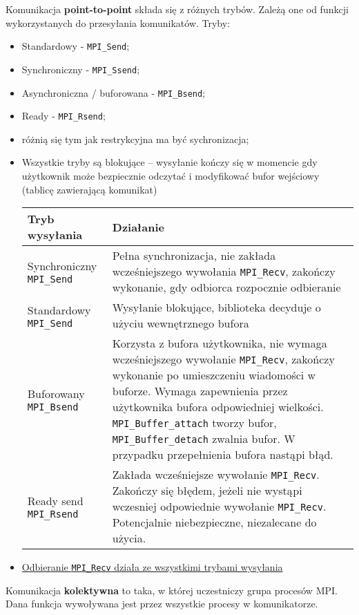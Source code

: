 Komunikacja \textbf{point-to-point} składa się z różnych trybów. Zależą one od funkcji wykorzystanych do przesyłania komunikatów. Tryby:
\begin{itemize}
\item Standardowy - \texttt{MPI\_Send};
\item Synchroniczny - \texttt{MPI\_Ssend};
\item Asynchroniczna / buforowana - \texttt{MPI\_Bsend};
\item Ready - \texttt{MPI\_Rsend};
\item różnią się tym jak restrykcyjna ma być sychronizacja;
\item Wszystkie tryby są blokujące – wysyłanie kończy się w momencie gdy użytkownik może bezpiecznie odczytać i modyfikować bufor wejściowy (tablicę zawierającą komunikat)
\begin{table}[H]
\begin{tabularx}{\textwidth}{|l|X|}\hline
\textbf{Tryb wysyłania} & \textbf{Działanie} \\ \hline
Synchroniczny \texttt{MPI\_Send} & Pełna synchronizacja, nie zakłada wcześniejszego wywołania \texttt{MPI\_Recv}, zakończy wykonanie, gdy odbiorca rozpocznie odbieranie \\ \hline
Standardowy \texttt{MPI\_Send} & Wysyłanie blokujące, biblioteka decyduje o użyciu wewnętrznego bufora \\ \hline
Buforowany \texttt{MPI\_Bsend} & Korzysta z bufora użytkownika, nie wymaga wcześniejszego wywołanie \texttt{MPI\_Recv}, zakończy wykonanie po umieszczeniu wiadomości w buforze. Wymaga zapewnienia przez użytkownika bufora odpowiedniej wielkości. \texttt{MPI\_Buffer\_attach} tworzy bufor, \texttt{MPI\_Buffer\_detach} zwalnia bufor. W przypadku przepełnienia bufora nastąpi błąd. \\ \hline
Ready send \texttt{MPI\_Rsend} & Zakłada wcześniejsze wywołanie \texttt{MPI\_Recv}. Zakończy się błędem, jeżeli nie wystąpi wczesniej odpowiednie wywołanie \texttt{MPI\_Recv}. Potencjalnie niebezpieczne, niezalecane do użycia. \\ \hline
\end{tabularx}
\end{table}
\item \underline{Odbieranie \texttt{MPI\_Recv} działa ze wszystkimi trybami wysyłania}
\end{itemize}

Komunikacja \textbf{kolektywna} to taka, w której uczestniczy grupa procesów MPI. Dana funkcja wywoływana jest przez wszystkie procesy w komunikatorze. 


